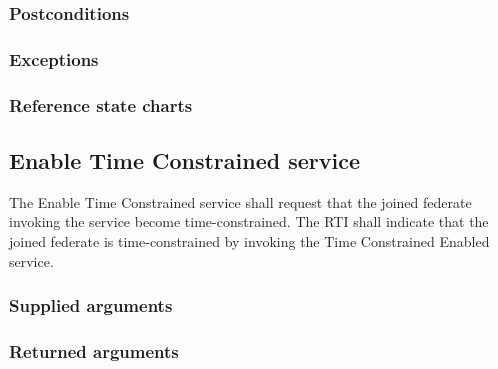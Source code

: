\begin{compactstdpage}

    \subsubsection{Postconditions}


    \subsubsection{Exceptions}


    \subsubsection{Reference state charts}


    \subsection{Enable Time Constrained service}

    The Enable Time Constrained service shall request that the joined federate invoking the service become time-constrained. The RTI shall indicate that the joined federate is time-constrained by invoking the Time Constrained Enabled \rtiinitiated{} service.

    \subsubsection{Supplied arguments}


    \subsubsection{Returned arguments}



\end{compactstdpage}
